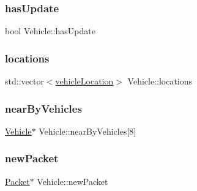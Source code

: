 \hypertarget{class_vehicle_a8356764cc782f2b5dc203fb647b9d56a}{}\label{class_vehicle_a8356764cc782f2b5dc203fb647b9d56a} 
\subsubsection{\texorpdfstring{has\+Update}{hasUpdate}}
{\footnotesize\ttfamily bool Vehicle\+::has\+Update\hspace{0.3cm}{\ttfamily [protected]}}

\hypertarget{class_vehicle_afac76350900a93121a936df50e550da2}{}\label{class_vehicle_afac76350900a93121a936df50e550da2} 
\subsubsection{\texorpdfstring{locations}{locations}}
{\footnotesize\ttfamily std\+::vector$<$\hyperlink{structvehicle_location}{vehicle\+Location}$>$ Vehicle\+::locations\hspace{0.3cm}{\ttfamily [protected]}}

\hypertarget{class_vehicle_a4ef4786810a90ca81c0b02f6005fc36a}{}\label{class_vehicle_a4ef4786810a90ca81c0b02f6005fc36a} 
\subsubsection{\texorpdfstring{near\+By\+Vehicles}{nearByVehicles}}
{\footnotesize\ttfamily \hyperlink{class_vehicle}{Vehicle}$\ast$ Vehicle\+::near\+By\+Vehicles\mbox{[}8\mbox{]}}

\hypertarget{class_vehicle_a980fe4f1b97097b24c28dba4909854bc}{}\label{class_vehicle_a980fe4f1b97097b24c28dba4909854bc} 
\subsubsection{\texorpdfstring{new\+Packet}{newPacket}}
{\footnotesize\ttfamily \hyperlink{struct_packet}{Packet}$\ast$ Vehicle\+::new\+Packet\hspace{0.3cm}{\ttfamily [protected]}}

\hypertarget{class_vehicle_a4e624a924953072b730cbc3d8045735f}{}\label{class_vehicle_a4e624a924953072b730cbc3d8045735f} 
